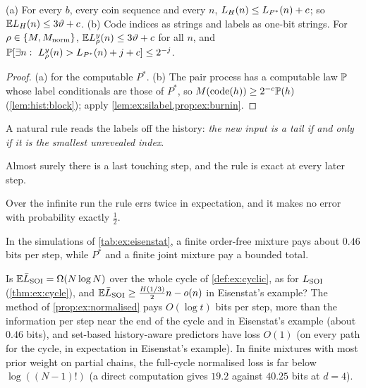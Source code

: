 \begin{theorem}\label{thm:ex:eisensi}
(a) For every $b$, every coin sequence and every $n$, $L_{H}(n)\le L_{P^*}(n)+c$; so $\mathbb{E}L_{H}(n)\le3\vartheta+c$.
(b) Code indices as strings and labels as one-bit strings. For $\rho\in\{M,M_{\mathrm{norm}}\}$, $\mathbb{E} L^y_\rho(n)\le3\vartheta+c$ for all $n$, and $\Prob[\exists n:\ L^y_\rho(n)>L_{P^*}(n)+j+c]\le2^{-j}$.
\end{theorem}

\begin{proof}
(a)  for the computable $P^*$. (b) The pair process has a computable law $\mathbb{P}$ whose label conditionals are those of $P^*$, so $M(\operatorname{code}(h))\ge2^{-c}\mathbb{P}(h)$ (\cref{lem:hist:block}); apply \cref{lem:ex:silabel,prop:ex:burnin}.
\end{proof}

A natural rule reads the labels off the history: \emph{the new input is a tail if and only if it is the smallest unrevealed index}.

\begin{corollary}\label{cor:ex:rule}
Almost surely there is a last touching step, and the rule is exact at every later step.
\end{corollary}

\begin{proposition}\label{prop:ex:rulestats}
Over the infinite run the rule errs twice in expectation, and it makes no error with probability exactly $\frac12$.
\end{proposition}

In the simulations of \cref{tab:ex:eisenstat}, a finite order-free mixture pays about $0.46$ bits per step, while $P^*$ and a finite joint mixture pay a bounded total.

\begin{question}\label{q:ex:normalised}
Is $\mathbb{E}\bar{L}_{\mathrm{SOI}}=\Omega(N\log N)$ over the whole cycle of \cref{def:ex:cyclic}, as for $L_{\mathrm{SOI}}$ (\cref{thm:ex:cycle}), and $\mathbb{E}\bar{L}_{\mathrm{SOI}}\ge\frac{H(1/3)}2n-o(n)$ in Eisenstat's example? The method of \cref{prop:ex:normalised} pays $O(\log t)$ bits per step, more than the information per step near the end of the cycle and in Eisenstat's example (about $0.46$ bits), and set-based history-aware predictors have loss $O(1)$ (on every path for the cycle, in expectation in Eisenstat's example). In finite mixtures with most prior weight on partial chains, the full-cycle normalised loss is far below $\log((N-1)!)$ (a direct computation gives $19.2$ against $40.25$ bits at $d=4$).
\end{question}

